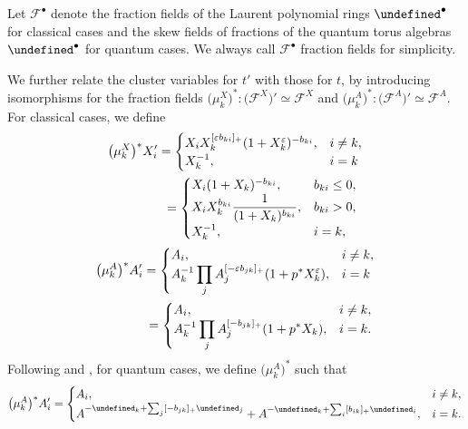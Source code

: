 \documentclass[10pt,a4paper]{amsart}
\newcommand{\cF}{{\mathcal F}}
\let\LP\undefined
\let\ff\undefined
\newcommand{\LP}{{\mathcal{LP}}}
\newcommand{\ff}{\mathbf{f}}
\numberwithin{equation}{section}
\begin{document}
Let $\cF^\bullet$ denote the fraction fields of the Laurent polynomial rings $\LP^\bullet$ for classical cases and the skew fields of fractions of the quantum torus algebras $\LP^\bullet$ for quantum cases. We always call $\cF^\bullet$ fraction fields for simplicity.

We further relate the cluster variables for $t'$ with those for $t$,
by introducing isomorphisms for the fraction fields $\big(\mu_{k}^{X}\big)^{*}\colon\big(\cF^{X}\big)'\simeq\cF^{X}$
and $\big(\mu_{k}^{A}\big)^{*}\colon\big(\cF^{A}\big)'\simeq\cF^{A}$. For classical cases, we define
\begin{gather*}
\big(\mu_{k}^{X}\big)^{*}X_{i}' =\begin{cases}
X_{i}X_{k}^{[\varepsilon b_{ki}]_{+}}(1+X_{k}^{\varepsilon})^{-b_{ki}},& i\neq k,\\
X_{k}^{-1}, & i=k
\end{cases}\\
\hphantom{\big(\mu_{k}^{X}\big)^{*}X_{i}'}{} =\begin{cases}
X_{i}(1+X_{k})^{-b_{ki}}, & b_{ki}\leq0,\\
\displaystyle X_{i}X_{k}^{b_{ki}}\frac{1}{(1+X_{k})^{b_{ki}}},& b_{ki}>0,\\
X_{k}^{-1}, & i=k,
\end{cases}\\
\big(\mu_{k}^{A}\big)^{*}A_{i}' =\begin{cases}
 A_{i}, & i\neq k,\\
 \displaystyle A_{k}^{-1}\prod_{j}A_{j}^{[-\varepsilon b_{jk}]_{+}}(1+p^{*}X_{k}^\varepsilon), & i=k
\end{cases} \\
\hphantom{\big(\mu_{k}^{A}\big)^{*}A_{i}'}{}
=\begin{cases}
A_{i}, & i\neq k,\\
\displaystyle A_{k}^{-1}\prod_{j}A_{j}^{[-b_{jk}]_{+}}(1+p^{*}X_{k}), & i=k.
\end{cases}
\end{gather*}
Following \cite[equation (2.6)]{qin2019bases} and \cite[equations (2.2) and (2.4)]{qin2020dual}, for quantum cases, we define $\big(\mu_{k}^{A}\big)^{*}$ such that
 \begin{align*}
 \big(\mu_{k}^{A}\big)^{*}A_{i}' =\begin{cases}
 A_{i}, & i\neq k,\\
 A^{-\ff_k+\sum_j [-b_{jk}]_{+}\ff_j}+A^{-\ff_k+\sum_i [b_{ik}]_{+}\ff_i}, & i=k.
 \end{cases}
 \end{align*}
\end{document}
